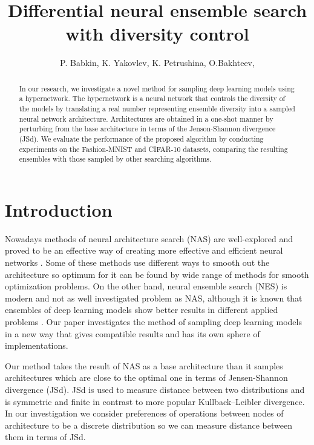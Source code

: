 \documentclass{article}
\title{Differential neural ensemble search with diversity control}
\author{P. Babkin, K. Yakovlev, K. Petrushina, O.Bakhteev,
}
\date{}
\begin{document}
\maketitle

\begin{abstract}
	
In our research, we investigate a novel method for sampling deep learning models using a hypernetwork. The hypernetwork is a neural network that controls the diversity of the models by translating a real number representing ensemble diversity into a sampled neural network architecture. Architectures are obtained in a one-shot manner by perturbing from the base architecture in terms of the Jenson-Shannon divergence (JSd). We evaluate the performance of the proposed algorithm by conducting experiments on the Fashion-MNIST and CIFAR-10 datasets, comparing the resulting ensembles with those sampled by other searching algorithms.

\end{abstract}



\section{Introduction}

Nowadays methods of neural architecture search (NAS) are well-explored and proved to be an effective way of creating
more effective and efficient neural networks \citep{darts, robustify, xnas}. Some of these methods use different ways to smooth out the architecture so optimum for it can
be found by wide range of methods for smooth optimization problems. On the other hand, neural ensemble search (NES) is
modern and not as well investigated problem as NAS, although it is known that ensembles of deep learning models show better
results in different applied problems \citep{multi-head}.
Our paper investigates the method of sampling deep learning models in a new way that gives compatible results and has its own sphere
of implementations.

Our method takes the result of NAS as a base architecture than it samples architectures which are close to the optimal one in terms of Jensen-Shannon divergence (JSd).
JSd is used to measure distance between two distributions and is symmetric and finite in contrast to more popular Kullback–Leibler divergence. In our investigation we consider preferences of operations between nodes of architecture to be a discrete distribution so we can measure distance between them in terms of JSd.
\end{document}

